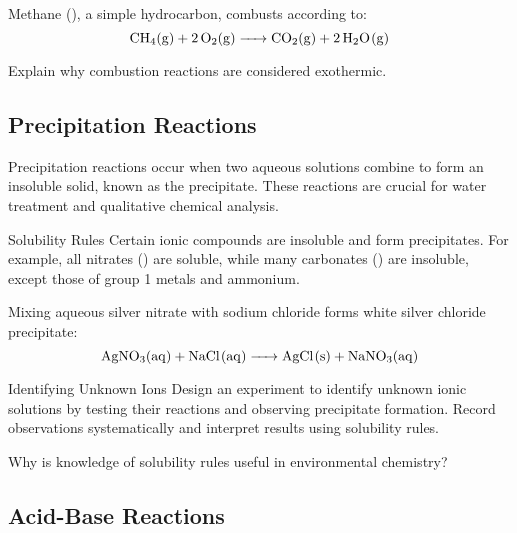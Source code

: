 \begin{example}
Methane (), a simple hydrocarbon, combusts according to:
\[
\ce{CH4(g) + 2O2(g) -> CO2(g) + 2H2O(g)}
\]
\end{example}

\begin{stopandthink}
Explain why combustion reactions are considered exothermic.
\end{stopandthink}

\subsection{Precipitation Reactions}
\FloatBarrier
\FloatBarrier
\FloatBarrier

Precipitation reactions occur when two aqueous solutions combine to form an insoluble solid, known as the precipitate. These reactions are crucial for water treatment and qualitative chemical analysis.

\begin{keyconcept}{Solubility Rules}
Certain ionic compounds are insoluble and form precipitates. For example, all nitrates () are soluble, while many carbonates () are insoluble, except those of group 1 metals and ammonium.
\end{keyconcept}

\begin{example}
Mixing aqueous silver nitrate with sodium chloride forms white silver chloride precipitate:
\[
\ce{AgNO3(aq) + NaCl(aq) -> AgCl(s) + NaNO3(aq)}
\]
\end{example}

\begin{investigation}{Identifying Unknown Ions}
Design an experiment to identify unknown ionic solutions by testing their reactions and observing precipitate formation. Record observations systematically and interpret results using solubility rules.
\end{investigation}

\begin{stopandthink}
Why is knowledge of solubility rules useful in environmental chemistry?
\end{stopandthink}

\subsection{Acid-Base Reactions}
\FloatBarrier
\FloatBarrier
\FloatBarrier


